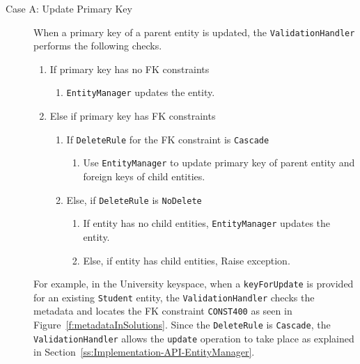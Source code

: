 \begin{description}
		\begin{description}
		\item[Case A: Update Primary Key] When a  primary key of a
		parent entity is updated,  the \texttt{ValidationHandler} performs the
		following checks. 
		\renewcommand{\labelenumii}{\arabic{enumi}. \arabic{enumii}}
		\renewcommand{\labelenumiii}{\arabic{enumi}. \arabic{enumii}. \arabic{enumiii}}
		\begin{enumerate}
		  \item If primary key has no \ac{FK} constraints 
		  	\begin{enumerate}
		  		  \item \texttt{EntityManager}  updates the entity. 
			\end{enumerate}		  	
		  \item Else if primary key has  \ac{FK} constraints  
		  		\begin{enumerate}		  	
				  \item If \texttt{DeleteRule} for the \ac{FK} constraint is \texttt{Cascade}
				    	\begin{enumerate}
				    	  \item Use \texttt{EntityManager} to
				    	   update primary key of parent entity and foreign keys of child
				    	   entities. 
						\end{enumerate}
				  \item Else,  if \texttt{DeleteRule}  is \texttt{NoDelete}
						\begin{enumerate}
						  \item If entity has no child entities,  
						  		   \texttt{EntityManager}  updates the entity. 
						  \item Else,  if entity has child entities,  
						    	  Raise exception.  
						\end{enumerate}
				\end{enumerate}
		 \end{enumerate}
		 
		For example,   in the University keyspace,   when a
		 \texttt{keyForUpdate} is provided for an existing  \texttt{Student}
		entity,   the \texttt{ValidationHandler}
		checks the metadata and locates the \ac{FK} constraint \texttt{CONST400} as
		seen in Figure~\ref{f:metadataInSolutions}.  Since the \texttt{DeleteRule} is
		\texttt{Cascade},  the \texttt{ValidationHandler} allows the \texttt{update}
		operation to take place as explained in Section~\ref{ss:Implementation-API-EntityManager}. 
			

\end{description}
\end{description}
